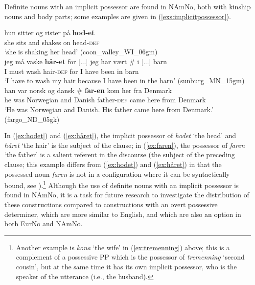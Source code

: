 \documentclass[output=paper,colorlinks,citecolor=brown]{langscibook}
\begin{document}
\noindent Definite nouns with an implicit possessor are found in NAmNo, both with kinship nouns and body parts; some examples are given in (\ref{exs:implicitpossessor}).


\ea \label{exs:implicitpossessor}
\ea \label{ex:hodet} \gll hun sitter og rister på \textbf{hod-et} \\
she sits and shakes on head-\textsc{def} \\
\glt `she is shaking her head' (coon\_valley\_WI\_06gm)\\
\ex \label{ex:håret} \gll jeg må vaske \textbf{hår-et} for [...] jeg har vært \# i [...] barn\\
I must wash hair-\textsc{def} for {} I have been {} in {} barn\\
\glt `I have to wash my hair because I have been in the barn' (sunburg\_MN\_15gm) \\
\ex \label{ex:faren} \gll han var norsk og dansk \#	\textbf{far-en} kom	her fra Denmark \\
he was Norwegian and Danish {} father-\textsc{def} came here from Denmark\\
\glt `He was Norwegian and Danish. His father came here from Denmark.' (fargo\_ND\_05gk) \\
\z 
\z 

\noindent In (\ref{ex:hodet}) and (\ref{ex:håret}), the implicit possessor of \emph{hodet} `the head' and \emph{håret} `the hair' is the subject of the clause; in (\ref{ex:faren}), the possessor of \emph{faren} `the father' is a salient referent in the discourse (the subject of the preceding clause; this  example differs from (\ref{ex:hodet}) and (\ref{ex:håret}) in that the possessed noun \emph{faren} is not in a configuration where it can be syntactically bound, see \citealt{lødrup2014kinship}).\footnote{Another example is \emph{kona} `the wife' in (\ref{ex:tremenning}) above; this is a complement of a possessive PP which is the possessor of \emph{tremenning} `second cousin', but at the same time it has its own implicit possessor, who is the speaker of the utterance (i.e., the husband).} 
Although the use of definite nouns with an implicit possessor is found in NAmNo, it is a task for future research to investigate the distribution of these constructions compared to constructions with an overt possessive determiner, which are more similar to English, and which are also an option in both EurNo and NAmNo.
\end{document}
